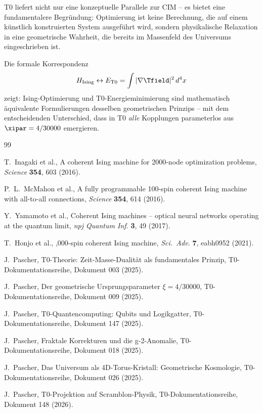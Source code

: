 T0 liefert nicht nur eine konzeptuelle Parallele zur CIM -- es bietet eine 
fundamentalere Begründung: Optimierung ist keine Berechnung, die auf einem 
künstlich konstruierten System ausgeführt wird, sondern physikalische Relaxation 
in eine geometrische Wahrheit, die bereits im Massenfeld des Universums 
eingeschrieben ist.

\begin{keyresult}
    Die formale Korrespondenz
    \begin{equation}
        H_{\text{Ising}} \leftrightarrow E_{\text{T0}} = \int |\nabla \Tfield|^2 \, d^4x
    \end{equation}
    zeigt: Ising-Optimierung und T0-Energieminimierung sind mathematisch äquivalente 
    Formulierungen desselben geometrischen Prinzips -- mit dem entscheidenden Unterschied, 
    dass in T0 \emph{alle} Kopplungen parameterlos aus $\xipar = 4/30000$ emergieren.
\end{keyresult}

\begin{thebibliography}{99}

T.~Inagaki et al.,
\newblock A coherent Ising machine for 2000-node optimization problems,
\newblock \emph{Science} \textbf{354}, 603 (2016).

P.~L.~McMahon et al.,
\newblock A fully programmable 100-spin coherent Ising machine with all-to-all connections,
\newblock \emph{Science} \textbf{354}, 614 (2016).

Y.~Yamamoto et al.,
\newblock Coherent Ising machines -- optical neural networks operating at the quantum limit,
\newblock \emph{npj Quantum Inf.} \textbf{3}, 49 (2017).

T.~Honjo et al.,
,000-spin coherent Ising machine,
\newblock \emph{Sci.\ Adv.} \textbf{7}, eabh0952 (2021).

J.~Pascher,
\newblock T0-Theorie: Zeit-Masse-Dualität als fundamentales Prinzip,
\newblock T0-Dokumentationsreihe, Dokument 003 (2025).

J.~Pascher,
\newblock Der geometrische Ursprungsparameter $\xi = 4/30000$,
\newblock T0-Dokumentationsreihe, Dokument 009 (2025).

J.~Pascher,
\newblock T0-Quantencomputing: Qubits und Logikgatter,
\newblock T0-Dokumentationsreihe, Dokument 147 (2025).

J.~Pascher,
\newblock Fraktale Korrekturen und die g-2-Anomalie,
\newblock T0-Dokumentationsreihe, Dokument 018 (2025).

J.~Pascher,
\newblock Das Universum als 4D-Torus-Kristall: Geometrische Kosmologie,
\newblock T0-Dokumentationsreihe, Dokument 026 (2025).

J.~Pascher,
\newblock T0-Projektion auf Scramblon-Physik,
\newblock T0-Dokumentationsreihe, Dokument 148 (2026).

\end{thebibliography}
